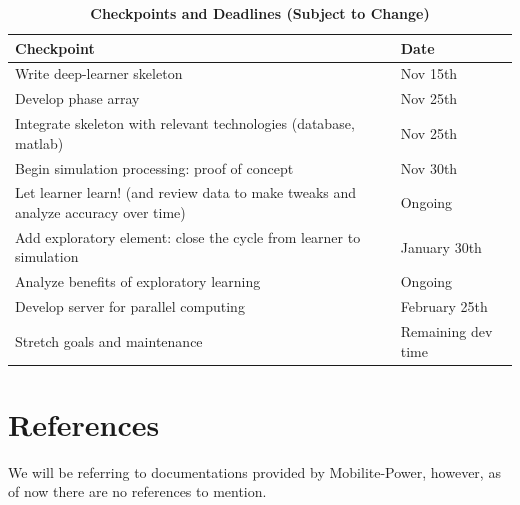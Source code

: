\documentclass[12pt, titlepage]{article}
\begin{document}
\begin{table}[H]
\centering
\caption{\bf Checkpoints and Deadlines (Subject to Change)}
\begin{tabular}{ |p{6cm}|p{3cm}|  } 
 \hline
\bf Checkpoint & \bf Date\\
 \hline
Write deep-learner skeleton & Nov 15th\\
 \hline
Develop phase array & Nov 25th\\
 \hline
Integrate skeleton with relevant technologies (database, matlab) & Nov 25th\\
  \hline
Begin simulation processing: proof of concept & Nov 30th\\
\hline
Let learner learn! (and review data to make tweaks and analyze accuracy over time) & Ongoing\\
\hline
Add exploratory element: close the cycle from learner to simulation & January 30th\\
\hline
Analyze benefits of exploratory learning & Ongoing\\
\hline
Develop server for parallel computing & February 25th\\
\hline
Stretch goals and maintenance & Remaining dev time\\
\hline
\end{tabular}
\end{table}

\section*{References}
We will be referring to documentations provided by Mobilite-Power, however, as of now there are no references to mention.





\newpage

\newpage{}
\end{document}
